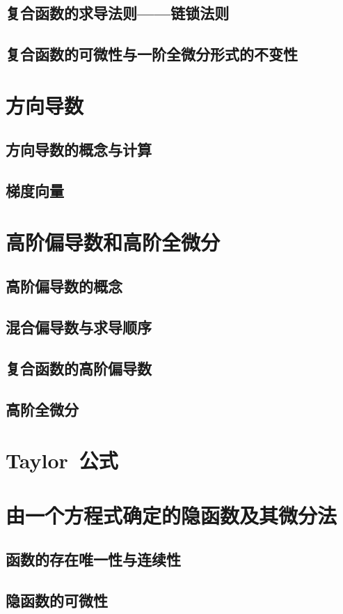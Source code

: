\subsection{复合函数的求导法则——链锁法则}
\subsection{复合函数的可微性与一阶全微分形式的不变性}
\begin{exercise}
\item
\end{exercise}
\section{方向导数}
\subsection{方向导数的概念与计算}
\subsection{梯度向量}
\begin{exercise}
\item
\end{exercise}
\section{高阶偏导数和高阶全微分}
\subsection{高阶偏导数的概念}
\subsection{混合偏导数与求导顺序}
\subsection{复合函数的高阶偏导数}
\subsection{高阶全微分}
\section{Taylor~公式}
\begin{exercise}
\item
\end{exercise}
\section{由一个方程式确定的隐函数及其微分法}
\subsection{函数的存在唯一性与连续性}
\subsection{隐函数的可微性}
\begin{exercise}
\item
\end{exercise}
\begin{exercise*}
\item
\end{exercise*}




\endinput
